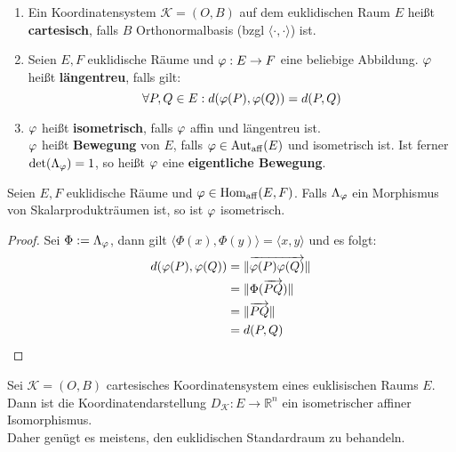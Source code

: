 \documentclass[parskip,a4paper,twoside,DIV15,BCOR12mm]{scrbook}
\begin{document}
\begin{definition}
\renewcommand{\labelenumi}{(\alph{enumi})}
\begin{enumerate}
\item Ein Koordinatensystem $\mathcal{K}=(O,B)$ auf dem euklidischen Raum $E$ heißt \textbf{cartesisch},
falls $B$ Orthonormalbasis (bzgl $\langle\cdot,\cdot\rangle$) ist.
\item Seien $E,F$ euklidische Räume und $\varphi:E\to F$ eine beliebige Abbildung. $\varphi$ heißt
\textbf{längentreu}, falls gilt:
\[\forall P,Q\in E: d(\varphi(P),\varphi(Q))=d(P,Q)\] 
\item $\varphi$ heißt \textbf{isometrisch}, falls $\varphi$ affin und längentreu ist.\\
$\varphi$ heißt \textbf{Bewegung} von $E$, falls $\varphi\in\operatorname{Aut_{aff}}(E)$ und isometrisch ist.
Ist ferner $\det(\Lambda_\varphi)=1$, so heißt $\varphi$ eine \textbf{eigentliche Bewegung}.
\end{enumerate}
\renewcommand{\labelenumi}{(\arabic{enumi})}
\end{definition}

\begin{comment}
Die Menge aller Bewegungen (schreibe $\Autdist(E)$) ist eine Gruppe mit Untergruppe
der Menge aller eigentlichen Bewegungen (schreibe $\Aut^+_\text{dist}(E)$).
\end{comment}

\begin{lemma}
Seien $E,F$ euklidische Räume und $\varphi\in\operatorname{Hom_{aff}}(E,F)$. Falls $\Lambda_\varphi$ ein 
Morphismus von Skalarprodukträumen ist, so ist $\varphi$ isometrisch.
\end{lemma}

\begin{proof}
Sei $\Phi :=\Lambda_\varphi$, dann gilt $\langle\Phi(x),\Phi(y)\rangle
=\langle x,y\rangle$ und es folgt:
\begin{align*}
d(\varphi(P),\varphi(Q))&=\|\overrightarrow{\varphi(P)\varphi(Q)}\|\\
&=\|\Phi(\overrightarrow{PQ})\|\\
&=\|\overrightarrow{PQ}\|\\
&= d(P,Q)
\end{align*}
\end{proof}

\begin{corollary}
Sei $\mathcal{K}=(O,B)$ cartesisches Koordinatensystem eines euklisischen Raums $E$. Dann
ist die Koordinatendarstellung $D_\mathcal{K}:E\to \mathbb{R}^n$ ein isometrischer affiner
Isomorphismus.\\
Daher genügt es meistens, den euklidischen Standardraum zu behandeln.
\end{corollary}
\end{document}
